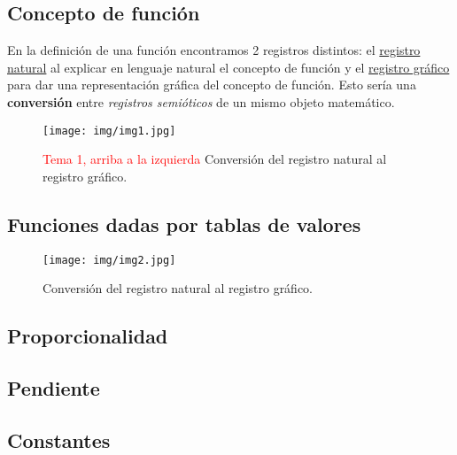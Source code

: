 \documentclass[palatino,nochap,nobuilddate]{apuntesURJC}
\begin{document}
\subsection{Concepto de función}

En la definición de una función encontramos 2 registros distintos: 
%
el \ul{registro natural} al explicar en lenguaje natural el concepto de función y el \ul{registro gr\'afico} para dar una representación gráfica del concepto de función. 
%
Esto sería una \textbf{conversión} entre \textit{registros semióticos} de un mismo objeto matemático.

\begin{figure}[hbtp]
\centering
\texttt{[image: img/img1.jpg]}
\caption{\textcolor{red}{Tema 1, arriba a la izquierda} Conversión del registro natural al registro gráfico.}
\label{img1}
\end{figure}

\subsection{Funciones dadas por tablas de valores}


\begin{figure}[hbtp]
\centering
\texttt{[image: img/img2.jpg]}
\caption{Conversión del registro natural al registro gráfico.}
\label{img2}
\end{figure}

\subsection{Proporcionalidad}

\subsection{Pendiente}


\subsection{Constantes}
\end{document}

